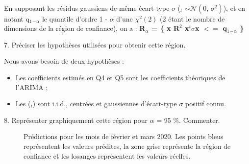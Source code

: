 \documentclass[a4paper, 12pt]{article} %
\begin{document}
\small{
{\\En supposant les résidus gaussiens de même écart-type $\sigma$ (\epsilon$_t$ $\sim \mathcal{N}(0,\,\sigma^{2})$),  et en notant q$_1$$_-$$_\alpha$ le quantile d'ordre 1 - $\alpha$ d'une ${\chi}^2(2)$ (2 étant le nombre de dimensions de la région de confiance), on a : \textbf{R$_\alpha$ = \{ x \in $\mathbf{R}^2$ \vert x$^t$$\sigma$x $<=$ q$_1$$_-$$_\alpha$ \}}
}}
\\
\begin{tcolorbox}
{\normalsize
7. Préciser les hypothèses utilisées pour obtenir cette région.
}
\end{tcolorbox}
\small{
{Nous avons besoin de deux hypothèses :
\begin{itemize}
\item Les coefficients estimés en Q4 et Q5 sont les coefficients théoriques de l'ARIMA ;
\item Les (\epsilon$_t$) sont i.i.d., centrées et gaussiennes d'écart-type $\sigma$ positif connu.
\end{itemize}}}
\begin{tcolorbox}
{\normalsize
8. Représenter graphiquement cette région pour $\alpha$ = 95 \%. Commenter.
}
\end{tcolorbox}
\begin{figure}[h]
    \centering
    \caption{Prédictions pour les mois de février et mars 2020. Les points bleus représentent les valeurs prédites, la zone grise représente la région de confiance et les losanges représentent les valeurs réelles.}
\end{figure}
\end{document}

